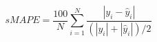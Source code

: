 \begin{equation}
sMAPE=\frac{100}{N} \sum_{i=1}^{N}  \frac{|y_{i}-\hat{y}_{i}|}{(|y_{i}|+|\hat{y}_{i}|)/2}
\label{eq:1_6}
\end{equation}







